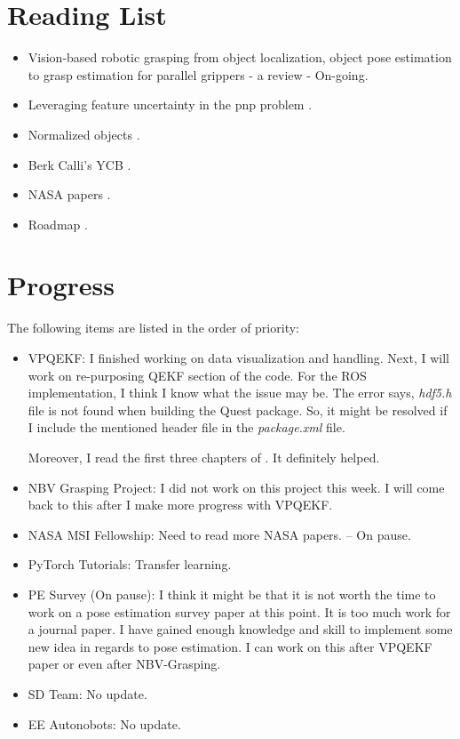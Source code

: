 \documentclass[11pt]{article}
\begin{document}
\section{Reading List}
\begin{itemize}
      \item Vision-based robotic grasping from object localization, object pose estimation to grasp estimation for parallel grippers - a review \cite{du2020vision} - On-going.
      \item Leveraging feature uncertainty in the pnp problem \cite{ferraz2014leveraging}.
      \item Normalized objects \cite{Wang_2019_CVPR}.
      \item Berk Calli's YCB \cite{calli2015ycb}.
      \item NASA papers \cite{NASATech44:online}.
      \item Roadmap \cite{roadmap251:online}.
\end{itemize}

\section{Progress}
The following items are listed in the order of priority:
\begin{itemize}
      \item VPQEKF: I finished working on data visualization and handling. Next,
      I will work on re-purposing QEKF section of the code. For the ROS implementation, I think I know what the issue may be. The error says, \textit{hdf5.h} file is not found when building the Quest package. So, it might be resolved if I include the mentioned header file in the \textit{package.xml} file.

      Moreover, I read the first three chapters of \cite{escriva2019building}. It definitely helped.

      \item NBV Grasping Project: I did not work on this project this week. I will come back to this after I make more progress with VPQEKF.

      \item NASA MSI Fellowship: Need to read more NASA papers. -- On pause.
      \item PyTorch Tutorials: Transfer learning.
      \item PE Survey (On pause): I think it might be that it is not worth the time to work on a pose estimation survey paper at this point. It is too much work for a journal paper. I have gained enough knowledge and skill to implement some new idea in regards to pose estimation. I can work on this after VPQEKF paper or even after NBV-Grasping.

      \item SD Team: No update.
      \item EE Autonobots: No update.
\end{itemize}
\end{document}
